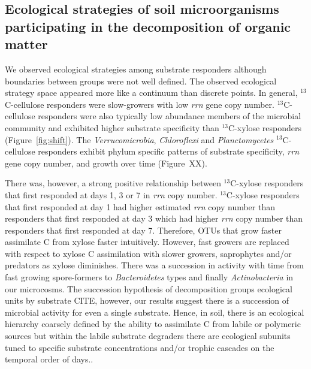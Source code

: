 \subsection{Ecological strategies of soil microorganisms participating in the
decomposition of organic matter}
We observed ecological strategies among substrate responders although
boundaries between groups were not well defined. The observed ecological
strategy space appeared more like a continuum than discrete points. In general,
$^{13}$C-cellulose responders were slow-growers with low \textit{rrn} gene copy
number. $^{13}$C-cellulose responders were also typically low abundance members
of the microbial community and exhibited higher substrate specificity than
$^{13}$C-xylose responders (Figure~\ref{fig:shift}). The \textit{Verrucomicrobia},
\textit{Chloroflexi} and \textit{Planctomycetes} $^{13}$C-cellulose responders exhibit 
phylum specific patterns of
substrate specificity, \textit{rrn} gene copy number, and growth over time (Figure~XX).

There was, however, a strong positive relationship between $^{13}$C-xylose
responders that first responded at days 1,
3 or 7 in \textit{rrn} copy number. $^{13}$C-xylose responders that first
responded at day 1 had higher estimated \textit{rrn} copy number than
responders that first responded at day 3 which had higher \textit{rrn} copy
number than responders that first responded at day 7.  Therefore, OTUs that
grow faster assimilate C from xylose faster intuitively.  However, fast growers
are replaced with respect to xylose C assimilation with slower growers,
saprophytes and/or predators as xylose diminishes. There was a succession in
activity with time from fast growing spore-formers to \textit{Bacteroidetes}
types and finally \textit{Actinobacteria} in our microcosms. The succession
hypothesis of decomposition groups ecological units by substrate CITE, however,
our results suggest there is a succession of microbial activity for even
a single substrate. Hence, in soil, there is an ecological hierarchy coarsely
defined by the ability to assimilate C from labile or polymeric sources but
within the labile substrate degraders there are ecological subunits tuned to
specific substrate concentrations and/or trophic cascades on the temporal order
of days..

